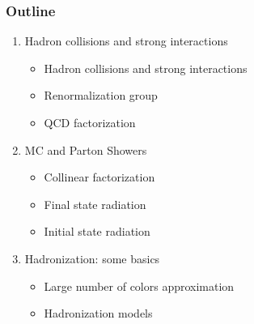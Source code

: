 \documentclass[aspectratio=43]{beamer}
\begin{document}
\begin{frame}

	\frametitle{Outline}
	
	\begin{enumerate}
		\item {\color{blue}Hadron collisions and strong interactions}
		\begin{itemize}
			\item Hadron collisions and strong interactions
			\item Renormalization group
			\item QCD factorization
		\end{itemize}
		\item {\color{blue}MC and Parton Showers}
		\begin{itemize}
			\item Collinear factorization
			\item Final state radiation
			\item Initial state radiation
		\end{itemize}
		\item {\color{blue}Hadronization: some basics}
		\begin{itemize}
			\item \footnotesize Large number of colors approximation
			\item \footnotesize Hadronization models
		\end{itemize}
	\end{enumerate}
	
\end{frame}
\end{document}

